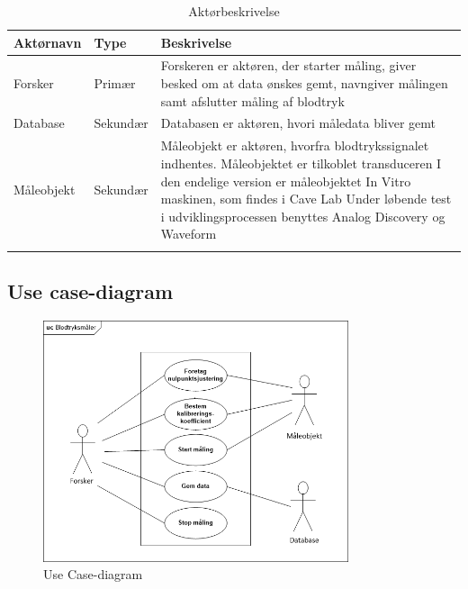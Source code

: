 \begin{table}[H]
\begin{tabularx}{\textwidth}{l l X}
     Aktørnavn	&	Type		&	Beskrivelse \\ \midrule
     Forsker   	& 	Primær  	& 	Forskeren er aktøren, der starter måling, giver besked om at data ønskes gemt, navngiver målingen samt afslutter måling af blodtryk \\ 			  \addlinespace[2mm]
     Database	&	Sekundær	&	Databasen er aktøren, hvori måledata bliver gemt \\   \addlinespace[2mm]
     Måleobjekt	&	Sekundær	&	Måleobjekt er aktøren, hvorfra blodtrykssignalet indhentes. Måleobjektet er tilkoblet transduceren
     I den endelige version er måleobjektet In Vitro maskinen, som findes i Cave Lab
     Under løbende test i udviklingsprocessen benyttes Analog Discovery og Waveform \\   \addlinespace[2mm]
     
   
     \bottomrule                                                                                                                   
    \end{tabularx}
    \caption {Aktørbeskrivelse}
    \label{tab:aktoerbeskrivelse}
	
\end{table}

\subsection{Use case-diagram}

\begin{figure}[H]
	\centering
	\includegraphics[width=0.8\textwidth]{Figurer/UseCasediagram}
	\caption{Use Case-diagram}
	\label{fig:Use Cases}
\end{figure}

